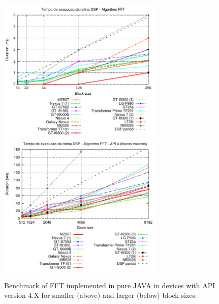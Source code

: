 \documentclass[12pt]{article}
\begin{document}
\begin{figure}[h!]
\begin{center}
\includegraphics[width=0.7\textwidth]{img/FFT_ALGORITHM-4-a.pdf}
\includegraphics[width=0.7\textwidth]{img/FFT_ALGORITHM-4-b.pdf}
\end{center}
\caption{Benchmark of FFT implemented in pure JAVA in devices with API version
4.X for smaller (above) and larger (below) block sizes.}
\label{fig:alg-fft}
\end{figure}
\end{document}
